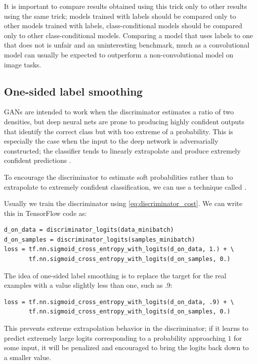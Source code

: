  It is important to compare results obtained using this trick only to other
 results using the same trick; models trained with labels should be compared
 only to other models trained with labels, class-conditional models should
 be compared only to other class-conditional models.
 Comparing a model that uses labels to one that does not is unfair and an
 uninteresting benchmark, much as a convolutional model can usually be expected
 to outperform a non-convolutional model on image tasks.

\subsection{One-sided label smoothing}
\label{sec:label_smooth}

GANs are intended to work when the discriminator estimates a ratio of two
densities, but deep neural nets are prone to producing highly confident
outputs that identify the correct class but with too extreme of a probability.
This is especially the case when the input to the deep network is adversarially
constructed; the classifier tends to linearly extrapolate and produce
extremely confident predictions \citep{Goodfellow-2015-adversarial}.

To encourage the discriminator to estimate soft probabilities rather than
to extrapolate to extremely confident classification, we can use a technique
called  \citep{Salimans-et-al-arxiv2014}.

Usually we train the discriminator using \eqref{eq:discriminator_cost}.
We can write this in TensorFlow \citep{tensorflow} code as:
\begin{lstlisting}
d_on_data = discriminator_logits(data_minibatch)
d_on_samples = discriminator_logits(samples_minibatch)
loss = tf.nn.sigmoid_cross_entropy_with_logits(d_on_data, 1.) + \
       tf.nn.sigmoid_cross_entropy_with_logits(d_on_samples, 0.)
\end{lstlisting}

The idea of one-sided label smoothing is to replace the target for the real examples
with a value slightly less than one, such as .9:

\begin{lstlisting}
loss = tf.nn.sigmoid_cross_entropy_with_logits(d_on_data, .9) + \
       tf.nn.sigmoid_cross_entropy_with_logits(d_on_samples, 0.)
\end{lstlisting}

This prevents extreme extrapolation behavior in the discriminator; if it learns
to predict extremely large logits corresponding to a probability approaching $1$
for some input, it will be penalized and encouraged to bring the logits back
down to a smaller value.


